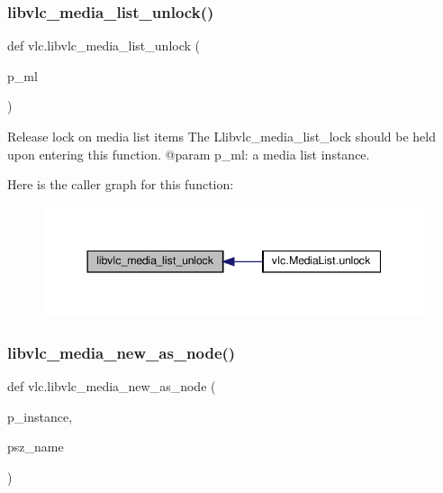 \subsubsection{\texorpdfstring{libvlc\+\_\+media\+\_\+list\+\_\+unlock()}{libvlc\_media\_list\_unlock()}}
{\footnotesize\ttfamily def vlc.\+libvlc\+\_\+media\+\_\+list\+\_\+unlock (\begin{DoxyParamCaption}\item[{}]{p\+\_\+ml }\end{DoxyParamCaption})}

\begin{DoxyVerb}Release lock on media list items
The L{libvlc_media_list_lock} should be held upon entering this function.
@param p_ml: a media list instance.
\end{DoxyVerb}
 Here is the caller graph for this function\+:
\nopagebreak
\begin{figure}[H]
\begin{center}
\leavevmode
\includegraphics[width=344pt]{namespacevlc_a6bfee9141e7623012496f9586c55aac6_icgraph}
\end{center}
\end{figure}
\mbox{\label{namespacevlc_ac0fdd830232f9a278f6631b2cf3f32d9}} 
\subsubsection{\texorpdfstring{libvlc\+\_\+media\+\_\+new\+\_\+as\+\_\+node()}{libvlc\_media\_new\_as\_node()}}
{\footnotesize\ttfamily def vlc.\+libvlc\+\_\+media\+\_\+new\+\_\+as\+\_\+node (\begin{DoxyParamCaption}\item[{}]{p\+\_\+instance,  }\item[{}]{psz\+\_\+name }\end{DoxyParamCaption})}

